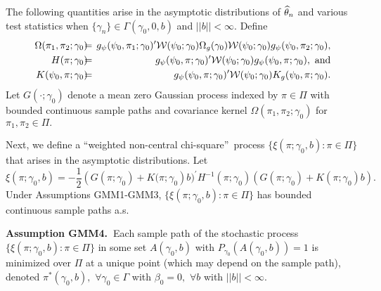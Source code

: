 \documentclass[12pt,thmsb,titlepage,final,oneside,letterpaper]{article}
\begin{document}
The following quantities arise in the asymptotic distributions of $\widehat{%
\theta }_{n}$ and various test statistics when $\{\gamma _{n}\}\in \Gamma
(\gamma _{0},0,b)$ and $||b||<\infty .$ Define%
\begin{eqnarray}
\Omega (\pi _{1},\pi _{2};\gamma _{0})\hspace{-0.08in} &=&\hspace{-0.08in}%
g_{\psi }(\psi _{0},\pi _{1};\gamma _{0})^{\prime }\mathcal{W}(\psi
_{0};\gamma _{0})\Omega _{g}(\gamma _{0})\mathcal{W}(\psi _{0};\gamma
_{0})g_{\psi }(\psi _{0},\pi _{2};\gamma _{0}),  \notag \\
H(\pi ;\gamma _{0})\hspace{-0.08in} &=&\hspace{-0.08in}g_{\psi }(\psi
_{0},\pi ;\gamma _{0})^{\prime }\mathcal{W}(\psi _{0};\gamma _{0})g_{\psi
}(\psi _{0},\pi ;\gamma _{0}),\text{ and}  \notag \\
K(\psi _{0},\pi ;\gamma _{0})\hspace{-0.08in} &=&\hspace{-0.08in}g_{\psi
}(\psi _{0},\pi ;\gamma _{0})^{\prime }\mathcal{W}(\psi _{0};\gamma
_{0})K_{g}(\psi _{0},\pi ;\gamma _{0}).  \label{Omega, H, and K defns}
\end{eqnarray}%
Let $G(\cdot ;\gamma _{0})$ denote a mean zero Gaussian process indexed by $%
\pi \in \Pi $ with bounded continuous sample paths and covariance kernel $%
\Omega (\pi _{1},\pi _{2};\gamma _{0})$ for $\pi _{1},\pi _{2}\in \Pi .$

Next, we define a \textquotedblleft weighted non-central
chi-square\textquotedblright\ process $\{\xi (\pi ;\gamma _{0},b):\pi \in
\Pi \}$ that arises in the asymptotic distributions. Let%
\begin{equation}
\xi (\pi ;\gamma _{0},b)=-\frac{1}{2}\left( G(\pi ;\gamma _{0})+K(\pi
;\gamma _{0}\right) b)^{\prime }H^{-1}(\pi ;\gamma _{0})\left( G(\pi ;\gamma
_{0})+K(\pi ;\gamma _{0})b\right) .  \label{Defn of Xi Stoch Process}
\end{equation}%
Under Assumptions GMM1-GMM3, $\{\xi (\pi ;\gamma _{0},b):\pi \in \Pi \}$ has
bounded continuous sample paths a.s.\medskip

\noindent \textbf{Assumption GMM4.\ }Each sample path of the stochastic
process $\{\xi (\pi ;\gamma _{0},b):\pi \in \Pi \}$ in some set $A(\gamma
_{0},b)$ with $P_{\gamma _{0}}(A(\gamma _{0},b))=1$ is minimized over $\Pi $
at a unique point (which may depend on the sample path), denoted $\pi ^{\ast
}(\gamma _{0},b),$ $\forall \gamma _{0}\in \Gamma $ with $\beta _{0}=0,$ $%
\forall b$ with $||b||<\infty .$\medskip
\end{document}
